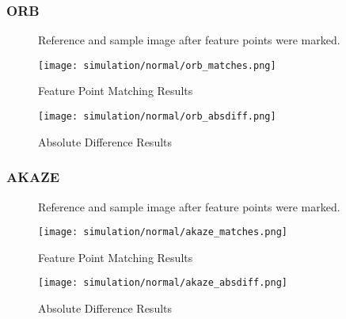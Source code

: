 		\subsubsection{ORB}
		\begin{figure}[H]
			\caption{Reference and sample image after feature points were marked.}
			\label{fig:siftFeaturePoints}
		\end{figure}
		\begin{figure}[H]
			\texttt{[image: simulation/normal/orb\_matches.png]}
			\caption{Feature Point Matching Results}
			\label{fig:sifeMatchingResult}
		\end{figure}
		\begin{figure}[H]
			\texttt{[image: simulation/normal/orb\_absdiff.png]}
			\caption{Absolute Difference Results}
			\label{fig:siftAbsDifference}
		\end{figure}

		\subsubsection{AKAZE}
		\begin{figure}[H]
			\caption{Reference and sample image after feature points were marked.}
			\label{fig:siftFeaturePoints}
		\end{figure}
		\begin{figure}[H]
			\texttt{[image: simulation/normal/akaze\_matches.png]}
			\caption{Feature Point Matching Results}
			\label{fig:sifeMatchingResult}
		\end{figure}
		\begin{figure}[H]
			\texttt{[image: simulation/normal/akaze\_absdiff.png]}
			\caption{Absolute Difference Results}
			\label{fig:siftAbsDifference}
		\end{figure}
